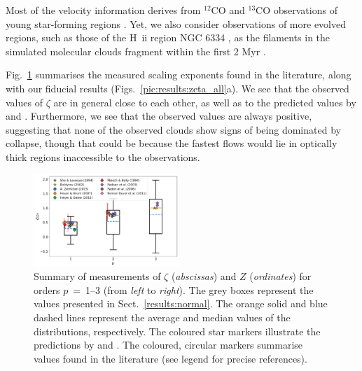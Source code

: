 

Most of the velocity information derives from $^{12}$CO and $^{13}$CO observations of young star-forming regions \citep[e.g., Perseus and Taurus][]{Padoan2003}.
Yet, we also consider observations of more evolved regions, such as those of the H~{\sc ii} region NGC 6334 \citep{Zernickel2015}, as the filaments in the simulated molecular clouds fragment within the first 2 Myr .

Fig.~\ref{pic:discussion:comp_observation} summarises the measured scaling exponents found in the literature, along with our fiducial results (Figs.~\ref{pic:results:zeta_all}a).
We see that the observed values of $\zeta$ are in general close to each other, as well as to the predicted values by \citet{She1994} and \citet{Boldyrev2002}. 
Furthermore, we see that the observed values are always positive, suggesting that none of the observed clouds show signs of being dominated by collapse, though that could be because the fastest flows would lie in optically thick regions inaccessible to the observations.  

\begin{figure}
	\includegraphics[width=0.49\textwidth]{compare_observations.pdf}
	\caption{Summary of measurements of $\zeta$ (\textit{abscissas}) and $Z$ (\textit{ordinates}) for orders $p$~=~1--3 (from \textit{left} to \textit{right}). The grey boxes represent the values presented in Sect.~\ref{results:normal}. The orange solid and blue dashed lines represent the average and median values of the distributions, respectively. The coloured star markers illustrate the predictions by \citet{She1994} and \citet{Boldyrev2002}. The coloured, circular markers summarise values found in the literature (see legend for precise references).
	}
	\label{pic:discussion:comp_observation}
\end{figure}


